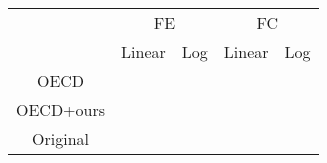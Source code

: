 \documentclass[11pt]{article}
\begin{document}
\pagestyle{empty}


\begin{table} \centering
    \begin{tabular}{c|c|c|c|c}
        \toprule
            & \multicolumn{2}{c}{FE} & \multicolumn{2}{c}{FC} \\
            & Linear & Log & Linear & Log \\
        \midrule
        OECD      &   &        &                                                      & \\
        \midrule
        OECD+ours &  &  &  &  \\
        \midrule
        Original  &    &    &  &  \\
        \bottomrule
    \end{tabular}
\end{table}
\end{document}
